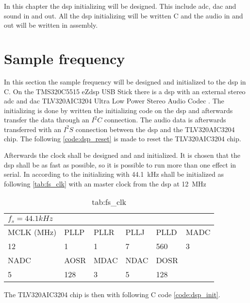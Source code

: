 \label{ch:disinit}
In this chapter the \gls{dsp} initializing will be designed. This include \gls{adc}, \gls{dac} and sound in and out. All the \gls{dsp} initializing will be written C and the audio in and out will be written in assembly. 

\section{Sample frequency}
In this section the sample frequency will be designed and initialized to the \gls{dsp} in C. \citep{slaa557}
On the TMS320C5515 eZdsp USB Stick there is a \gls{dsp} with an external stereo \gls{adc} and \gls{dac} TLV320AIC3204 Ultra Low Power Stereo Audio Codec \citep{TLV320AIC3204}. The initializing is done by written the initializing code on the \gls{dsp} and afterwards transfer the data through an $I^2C$ connection. The audio data is afterwards transferred with an $I^2S$ connection between the \gls{dsp} and the TLV320AIC3204 chip.
The following \autoref{code:dsp_reset} is made to reset the TLV320AIC3204 chip.


Afterwards the clock shall be designed and and initialized. It is chosen that the \gls{dsp} shall be as fast as possible, so it is possible to run more than one effect in serial. In according to \citep{slaa557} the initializing with \SI{44.1}{\kilo\hertz} shall be initialized as following \autoref{tab:fs_clk} with an master clock from the dsp at \SI{12}{\mega\hertz}

\begin{table}[]
\centering
\caption{tab:fs_clk}
\label{tab:fs_clk}
\begin{tabular}{|l|l|l|l|l|l|}
\hline
\multicolumn{6}{|l|}{$f_s=44.1kHz$}           \\ \hline
MCLK (MHz) & PLLP & PLLR & PLLJ & PLLD & MADC \\ \hline
12         & 1    & 1    & 7    & 560  & 3    \\ \hline
NADC       & AOSR & MDAC & NDAC & DOSR &      \\ \hline
5          & 128  & 3    & 5    & 128  &      \\ \hline
\end{tabular}
\end{table}


The TLV320AIC3204 chip is then with following C code  \autoref{code:dsp_init}.




